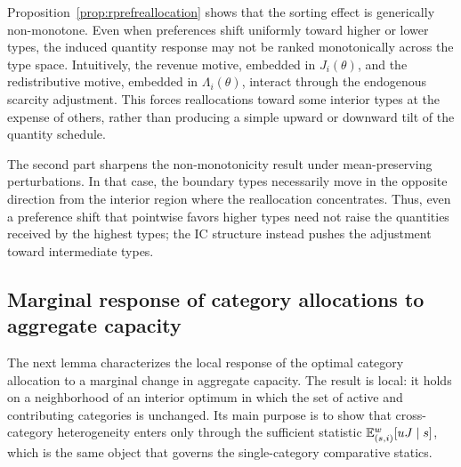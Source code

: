 \documentclass{class}
\begin{document}
Proposition~\ref{prop:rprefreallocation} shows that the sorting effect is generically non-monotone. Even when preferences shift uniformly toward higher or lower types, the induced quantity response may not be ranked monotonically across the type space. Intuitively, the revenue motive, embedded in $J_i(\theta)$, and the redistributive motive, embedded in $\Lambda_i(\theta)$, interact through the endogenous scarcity adjustment. This forces reallocations toward some interior types at the expense of others, rather than producing a simple upward or downward tilt of the quantity schedule.

The second part sharpens the non-monotonicity result under mean-preserving perturbations. In that case, the boundary types necessarily move in the opposite direction from the interior region where the reallocation concentrates. Thus, even a preference shift that pointwise favors higher types need not raise the quantities received by the highest types; the IC structure instead pushes the adjustment toward intermediate types.


\subsection{Marginal response of category allocations to aggregate capacity}\label{app:dkidk}

The next lemma characterizes the local response of the optimal category allocation to a marginal change in aggregate capacity. The result is local: it holds on a neighborhood of an interior optimum in which the set of active and contributing categories is unchanged. Its main purpose is to show that cross-category heterogeneity enters only through the sufficient statistic $\mathbb{E}_{(s,i)}^w[uJ\mid s]$, which is the same object that governs the single-category comparative statics.
\end{document}
